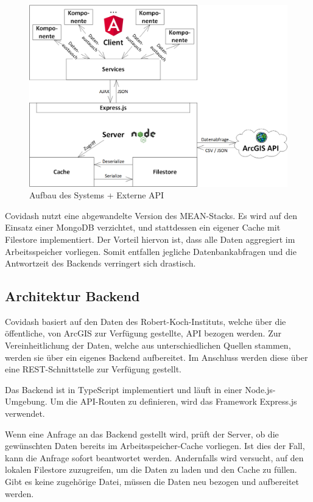 \documentclass[conference]{IEEEtran}
\begin{document}
\begin{figure}[htb]%
    \centering%
    \includegraphics[width=0.95\columnwidth]{img/TechnologieStackLogo.png}%
    \caption{Aufbau des Systems + Externe API}%
    \label{abb:aufbau}%
\end{figure}
Covidash nutzt eine abgewandelte Version des MEAN-Stacks. Es wird auf den Einsatz einer MongoDB verzichtet, und stattdessen ein eigener Cache mit Filestore implementiert. Der Vorteil hiervon ist, dass alle Daten aggregiert im Arbeitsspeicher vorliegen. Somit entfallen jegliche Datenbank\-abfragen und die Antwortzeit des Backends verringert sich drastisch.



\subsection{Architektur Backend}

Covidash basiert auf den Daten des Robert-Koch-Instituts, welche über die öffentliche, von ArcGIS zur Verfügung gestellte, API bezogen werden. Zur Vereinheitlichung der Daten, welche aus unterschiedlichen Quellen stammen, werden sie über ein eigenes Backend aufbereitet. Im Anschluss werden diese über eine REST-Schnittstelle zur Verfügung gestellt.

Das Backend ist in TypeScript implementiert und läuft in einer Node.js-Umgebung.
Um die API-Routen zu definieren, wird das Framework Express.js verwendet.

Wenn eine Anfrage an das Backend gestellt wird, prüft der Server, ob die gewünschten Daten bereits im Arbeitsspeicher-Cache vorliegen. Ist dies der Fall, kann die Anfrage sofort beantwortet werden. Andernfalls wird versucht, auf den lokalen Filestore zuzugreifen, um die Daten zu laden und den Cache zu füllen. Gibt es keine zugehörige Datei, müssen die Daten neu bezogen und aufbereitet werden.
\end{document}
